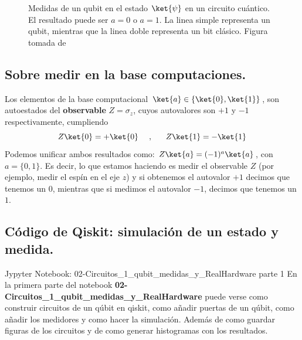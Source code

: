 \documentclass[a4paper,11pt]{book} %
\numberwithin{equation}{chapter}
\begin{document}
\begin{figure}[H] \setcounter{subfigure}{0} 
\centering
{}  \hspace{2cm}
\caption{Medidas de un qubit en el estado $\ket{\psi}$ en un circuito cuántico. El resultado puede ser $a = 0$ o $a=1$. La linea simple representa un qubit, mientras que la linea doble representa un bit clásico. Figura tomada de \cite{bib_Curso-JMas}}
\label{Fig_medidas1_cubit_meter}
\end{figure}

		\subsection{Sobre medir en la base computaciones.}

Los elementos de la base computacional $\ket{a}\in \{\ket{0},\ket{1}\}$, son autoestados del \textbf{observable} $Z = \sigma_z $, cuyos autovalores son $+1$ y $-1$ respectivamente, cumpliendo
$$
Z\ket{0} = +\ket{0}~~~~,~~~~~ Z\ket{1} = -\ket{1}
$$ 
Podemos unificar ambos resultados como: $Z\ket{a} = (-1)^a\ket{a}$, con  $a=\{0,1\}$. Es decir, lo que estamos haciendo es medir el observable $Z$ (por ejemplo, medir el espín en el eje $z$) y si obtenemos el autovalor $+1$ decimos que tenemos un 0, mientras que si medimos el autovalor $-1$, decimos que tenemos un $1$. 


		\subsection{Código de Qiskit: simulación de un estado y medida.}  \label{sec_medidas_subsub_codigo}

	\begin{mybox_orange}{Jypyter Notebook: 02-Circuitos\_1\_qubit\_medidas\_y\_RealHardware parte 1}
	En la primera parte del notebook \textbf{02-Circuitos\_1\_qubit\_medidas\_y\_RealHardware} puede verse como construir circuitos de un qúbit en qiskit, 
	como añadir puertas de un qúbit, como añadir los medidores y como hacer la simulación. Además de como guardar figuras de los
	circuitos y de como generar histogramas con los resultados.
	\end{mybox_orange}
	
\end{document}
